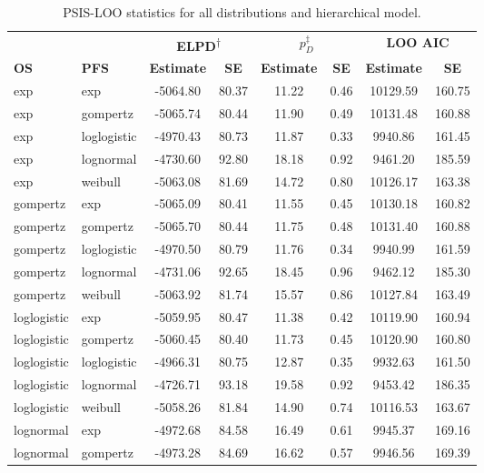 \documentclass[AMA,STIX1COL]{WileyNJD-v2}
\begin{document}
\begin{table}[H]
\caption{PSIS-LOO statistics for all distributions and hierarchical model. \label{tab:loo_hier}}
\centering
\begin{tabular}{l l c c c c c c}
\toprule
\multicolumn{1}{l}{} & \multicolumn{1}{l}{} & \multicolumn{2}{c}{\textbf{ELPD\textsuperscript{$\dagger$}}} & \multicolumn{2}{c}{\textbf{$p_D^{\ddagger}$}} & \multicolumn{2}{c}{\textbf{LOO AIC}} \\
\cmidrule{3-4}\cmidrule{5-6}\cmidrule{7-8}
\textbf{OS} & \textbf{PFS} & \textbf{Estimate} & \textbf{SE} & \textbf{Estimate} & \textbf{SE} & \textbf{Estimate} & \textbf{SE}\\
\midrule
exp & exp & -5064.80 & 80.37 & 11.22 & 0.46 & 10129.59 & 160.75\\
exp & gompertz & -5065.74 & 80.44 & 11.90 & 0.49 & 10131.48 & 160.88\\
exp & loglogistic & -4970.43 & 80.73 & 11.87 & 0.33 & 9940.86 & 161.45\\
exp & lognormal & -4730.60 & 92.80 & 18.18 & 0.92 & 9461.20 & 185.59\\
exp & weibull & -5063.08 & 81.69 & 14.72 & 0.80 & 10126.17 & 163.38\\
gompertz & exp & -5065.09 & 80.41 & 11.55 & 0.45 & 10130.18 & 160.82\\
gompertz & gompertz & -5065.70 & 80.44 & 11.75 & 0.48 & 10131.40 & 160.88\\
gompertz & loglogistic & -4970.50 & 80.79 & 11.76 & 0.34 & 9940.99 & 161.59\\
gompertz & lognormal & -4731.06 & 92.65 & 18.45 & 0.96 & 9462.12 & 185.30\\
gompertz & weibull & -5063.92 & 81.74 & 15.57 & 0.86 & 10127.84 & 163.49\\
loglogistic & exp & -5059.95 & 80.47 & 11.38 & 0.42 & 10119.90 & 160.94\\
loglogistic & gompertz & -5060.45 & 80.40 & 11.73 & 0.45 & 10120.90 & 160.80\\
loglogistic & loglogistic & -4966.31 & 80.75 & 12.87 & 0.35 & 9932.63 & 161.50\\
loglogistic & lognormal & -4726.71 & 93.18 & 19.58 & 0.92 & 9453.42 & 186.35\\
loglogistic & weibull & -5058.26 & 81.84 & 14.90 & 0.74 & 10116.53 & 163.67\\
lognormal & exp & -4972.68 & 84.58 & 16.49 & 0.61 & 9945.37 & 169.16\\
lognormal & gompertz & -4973.28 & 84.69 & 16.62 & 0.57 & 9946.56 & 169.39\\

\end{tabular}
\end{table}
\end{document}
